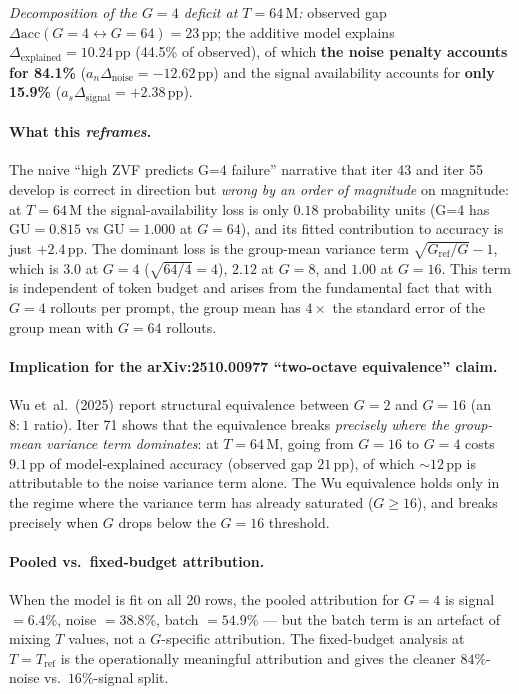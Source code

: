 \noindent\textit{Decomposition of the $G{=}4$ deficit at
$T{=}64\,\mathrm{M}$:}  observed gap $\Delta\mathrm{acc}(G{=}4
\leftrightarrow G{=}64) = 23\,\mathrm{pp}$; the additive model
explains $\Delta_{\mathrm{explained}} = 10.24\,\mathrm{pp}$ (44.5\%
of observed), of which \textbf{the noise penalty accounts for
84.1\%} ($a_n \Delta_{\mathrm{noise}} = -12.62\,\mathrm{pp}$) and
the signal availability accounts for \textbf{only 15.9\%}
($a_s \Delta_{\mathrm{signal}} = +2.38\,\mathrm{pp}$).

\paragraph{What this \emph{reframes}.}
The naive ``high ZVF predicts G=4 failure'' narrative that iter 43
and iter 55 develop is correct in direction but \emph{wrong by an
order of magnitude} on magnitude: at $T{=}64\,\mathrm{M}$ the
signal-availability loss is only $0.18$ probability units (G=4 has
$\mathrm{GU}{=}0.815$ vs $\mathrm{GU}{=}1.000$ at $G{=}64$), and
its fitted contribution to accuracy is just $+2.4\,\mathrm{pp}$.
The dominant loss is the group-mean variance term
$\sqrt{G_{\mathrm{ref}}/G} - 1$, which is $3.0$ at $G{=}4$
($\sqrt{64/4} = 4$), $2.12$ at $G{=}8$, and $1.00$ at $G{=}16$.
This term is independent of token budget and arises from the
fundamental fact that with $G{=}4$ rollouts per prompt, the group
mean has $4\times$ the standard error of the group mean with
$G{=}64$ rollouts.

\paragraph{Implication for the arXiv:2510.00977 ``two-octave
equivalence'' claim.}
Wu et~al.\ (2025) report structural equivalence between $G{=}2$ and
$G{=}16$ (an $8{:}1$ ratio).  Iter 71 shows that the equivalence
breaks \emph{precisely where the group-mean variance term
dominates}: at $T{=}64\,\mathrm{M}$, going from $G{=}16$ to $G{=}4$
costs $9.1\,\mathrm{pp}$ of model-explained accuracy (observed gap
$21\,\mathrm{pp}$), of which $\sim 12\,\mathrm{pp}$ is attributable
to the noise variance term alone.  The Wu equivalence holds only
in the regime where the variance term has already saturated
($G \ge 16$), and breaks precisely when $G$ drops below the
$G{=}16$ threshold.

\paragraph{Pooled vs.\ fixed-budget attribution.}
When the model is fit on all 20 rows, the pooled attribution for
$G{=}4$ is signal $= 6.4\%$, noise $= 38.8\%$, batch $= 54.9\%$
--- but the batch term is an artefact of mixing $T$ values, not a
$G$-specific attribution.  The fixed-budget analysis at
$T{=}T_{\mathrm{ref}}$ is the operationally meaningful attribution
and gives the cleaner $84\%$-noise vs.\ $16\%$-signal split.

